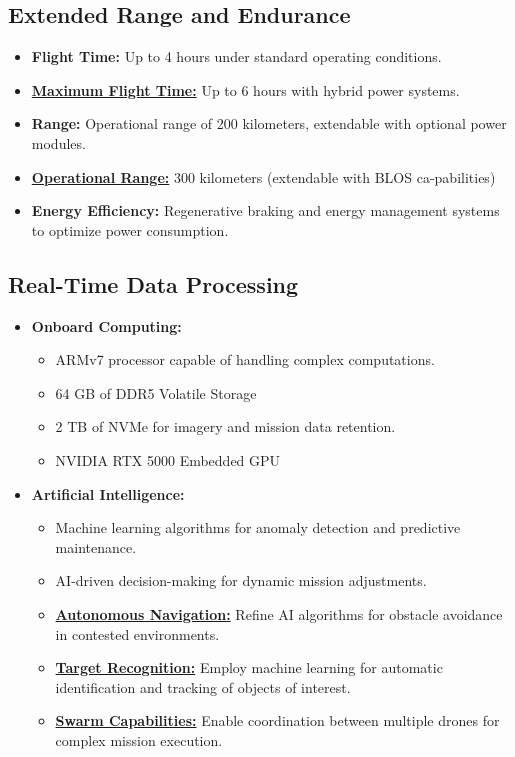 \documentclass{article}
\begin{document}
\subsection{Extended Range and Endurance}
\begin{itemize}
    \item \textbf{Flight Time:} Up to 4 hours under standard operating conditions.
    \item \textbf{\underline{Maximum Flight Time:}} Up to 6 hours with hybrid power systems.
    \item \textbf{Range:} Operational range of 200 kilometers, extendable with optional power modules.
    \item \textbf{\underline{Operational Range:}} 300 kilometers (extendable with BLOS ca-pabilities)
    \item \textbf{Energy Efficiency:} Regenerative braking and energy management systems to optimize power consumption.
\end{itemize}

\subsection{Real-Time Data Processing}
\begin{itemize}
    \item \textbf{Onboard Computing:}
    \begin{itemize}
        \item ARMv7 processor capable of handling complex computations.
        \item 64 GB of DDR5 Volatile Storage
        \item 2 TB of NVMe for imagery and mission data retention.
        \item NVIDIA RTX 5000 Embedded GPU
    \end{itemize}
    \item \textbf{Artiﬁcial Intelligence:}
    \begin{itemize}
        \item Machine learning algorithms for anomaly detection and predictive maintenance.
        \item AI-driven decision-making for dynamic mission adjustments.
        \item \textbf{\underline{Autonomous Navigation:}} Reﬁne AI algorithms for obstacle avoidance in contested environments.
        \item \textbf{\underline{Target Recognition:}} Employ machine learning for automatic identiﬁcation and tracking of objects of interest.
        \item \textbf{\underline{Swarm Capabilities:}} Enable coordination between multiple drones for complex mission execution.
    \end{itemize}
\end{itemize}
\end{document}
